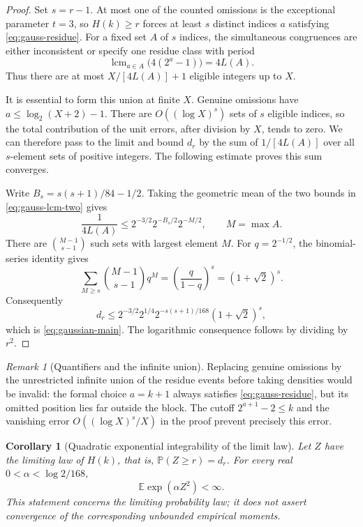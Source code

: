 \documentclass[11pt,a4paper]{article}
\newtheorem{corollary}[theorem]{Corollary}
\theoremstyle{definition}
\theoremstyle{remark}\newtheorem{remark}[theorem]{Remark}
\begin{document}
\begin{proof}
Set $s=r-1$.  At most one of the counted omissions is the exceptional
parameter $t=3$, so $H(k)\geq r$ forces at least $s$ distinct indices
$a$ satisfying \eqref{eq:gauss-residue}.  For a fixed set $A$ of $s$
indices, the simultaneous congruences are either inconsistent or specify
one residue class with period
\[
 \operatorname{lcm}_{a\in A}\bigl(4(2^a-1)\bigr)=4L(A).
\]
Thus there are at most $X/[4L(A)]+1$ eligible integers up to $X$.

It is essential to form this union at finite $X$.  Genuine omissions
have $a\leq\log_2(X+2)-1$.  There are $O((\log X)^s)$ sets of $s$
eligible indices, so the total contribution of the unit errors,
after division by $X$, tends to zero.  We can therefore pass to the
limit and bound $d_r$ by the sum of $1/[4L(A)]$ over all $s$-element
sets of positive integers.  The following estimate proves this sum
converges.

Write $B_s=s(s+1)/84-1/2$.  Taking the geometric mean of the two
bounds in \eqref{eq:gauss-lcm-two} gives
\[
 \frac1{4L(A)}\leq2^{-3/2}2^{-B_s/2}2^{-M/2},\qquad M=\max A.
\]
There are $\binom{M-1}{s-1}$ such sets with largest element $M$.
For $q=2^{-1/2}$, the binomial-series identity gives
\[
 \sum_{M\geq s}\binom{M-1}{s-1}q^M
 =\left(\frac{q}{1-q}\right)^s=(1+\sqrt2)^s.
\]
Consequently
\[
 d_r\leq 2^{-3/2}2^{1/4}
 2^{-s(s+1)/168}(1+\sqrt2)^s,
\]
which is \eqref{eq:gaussian-main}.  The logarithmic consequence follows
by dividing by $r^2$.
\end{proof}

\begin{remark}[Quantifiers and the infinite union]
Replacing genuine omissions by the unrestricted infinite union of the
residue events before taking densities would be invalid: the formal
choice $a=k+1$ always satisfies \eqref{eq:gauss-residue}, but its
omitted position lies far outside the block.  The cutoff
$2^{a+1}-2\leq k$ and the vanishing error
$O((\log X)^s/X)$ in the proof prevent precisely this error.
\end{remark}

\begin{corollary}[Quadratic exponential integrability of the limit law]
\label{cor:gauss-integrability}
Let $Z$ have the limiting law of $H(k)$, that is,
$\mathbb P(Z\geq r)=d_r$.  For every real
$0<\alpha<\log2/168$,
\[
 \mathbb E\exp(\alpha Z^2)<\infty.
\]
This statement concerns the limiting probability law; it does not
assert convergence of the corresponding unbounded empirical moments.
\end{corollary}
\end{document}
